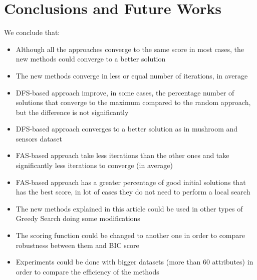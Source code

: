 \section{Conclusions and Future Works}
\label{sec:conclusions}

We conclude that:
\begin{itemize}
	\item Although all the approaches converge to the same score in most cases, the new methods could converge to a better solution
	\item The new methods converge in less or equal number of iterations, in average
	\item DFS-based approach improve, in some cases, the percentage number of solutions that converge to the maximum compared to the random approach, but the difference is not significantly
	\item DFS-based approach converges to a better solution as in mushroom and sensors dataset
	\item FAS-based approach take less iterations than the other ones and take significantly less iterations to converge (in average)
	\item FAS-based approach has a greater percentage of good initial solutions that has the best score, in lot of cases they do not need to perform a local search
	\item The new methods explained in this article could be used in other types of Greedy Search doing some modifications
	\item The scoring function could be changed to another one in order to compare robustness between them and BIC score
	\item Experiments could be done with bigger datasets (more than 60 attributes) in order to compare the efficiency of the methods
\end{itemize}